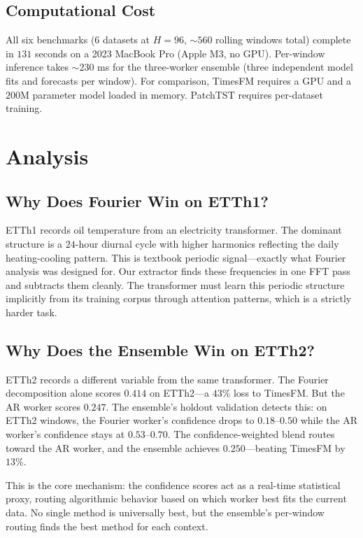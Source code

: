 \documentclass[sigconf,nonacm]{acmart}
\begin{document}
\subsection{Computational Cost}

All six benchmarks ($6$ datasets at $H=96$, $\sim$$560$ rolling windows total) complete in $131$ seconds on a 2023 MacBook Pro (Apple M3, no GPU). Per-window inference takes $\sim$$230$ ms for the three-worker ensemble (three independent model fits and forecasts per window). For comparison, TimesFM requires a GPU and a $200$M parameter model loaded in memory. PatchTST requires per-dataset training.

\section{Analysis}

\subsection{Why Does Fourier Win on ETTh1?}

ETTh1 records oil temperature from an electricity transformer. The dominant structure is a $24$-hour diurnal cycle with higher harmonics reflecting the daily heating-cooling pattern. This is textbook periodic signal---exactly what Fourier analysis was designed for. Our extractor finds these frequencies in one FFT pass and subtracts them cleanly. The transformer must learn this periodic structure implicitly from its training corpus through attention patterns, which is a strictly harder task.

\subsection{Why Does the Ensemble Win on ETTh2?}

ETTh2 records a different variable from the same transformer. The Fourier decomposition alone scores $0.414$ on ETTh2---a $43\%$ loss to TimesFM. But the AR worker scores $0.247$. The ensemble's holdout validation detects this: on ETTh2 windows, the Fourier worker's confidence drops to $0.18$--$0.50$ while the AR worker's confidence stays at $0.53$--$0.70$. The confidence-weighted blend routes toward the AR worker, and the ensemble achieves $0.250$---beating TimesFM by $13\%$.

This is the core mechanism: the confidence scores act as a real-time statistical proxy, routing algorithmic behavior based on which worker best fits the current data. No single method is universally best, but the ensemble's per-window routing finds the best method for each context.
\end{document}
